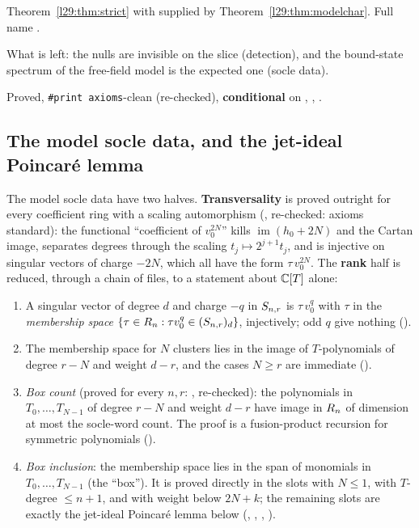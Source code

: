 \begin{dictionary}
Theorem~\ref{l29:thm:strict} with  supplied by Theorem~\ref{l29:thm:modelchar}. Full name
.
\end{dictionary}

\begin{physics}
What is left: the nulls are invisible on the slice (detection), and the bound-state spectrum of the free-field model
is the expected one (socle data).
\end{physics}

\begin{status}
Proved, \texttt{\#print axioms}-clean (re-checked), \textbf{conditional} on , , .
\end{status}

\subsection{The model socle data, and the jet-ideal Poincar\'e lemma}\label{l29:sec:poincare}

The model socle data have two halves. \textbf{Transversality} is proved outright for every coefficient ring with a
scaling automorphism (, re-checked: axioms standard): the functional ``coefficient of $v_0^{2N}$''
kills $\operatorname{im}(h_0+2N)$ and the Cartan image, separates degrees through the scaling $t_j\mapsto2^{j+1}t_j$, and
is injective on singular vectors of charge $-2N$, which all have the form $\tau\,v_0^{2N}$. The \textbf{rank} half is
reduced, through a chain of files, to a statement about ${\mathbb{C}}[T]$ alone:
\begin{enumerate}
\item A singular vector of degree $d$ and charge $-q$ in $S_{n,r}$ is $\tau\,v_0^{q}$ with $\tau$ in the
  \emph{membership space} $\{\tau\in R_n:\tau v_0^q\in(S_{n,r})_d\}$, injectively; odd $q$ give nothing
  ().
\item The membership space for $N$ clusters lies in the image of $T$-polynomials of degree $r-N$ and weight $d-r$, and the
  cases $N\ge r$ are immediate ().
\item \emph{Box count} (proved for every $n,r$: , re-checked): the polynomials in $T_0,\dots,T_{N-1}$
  of degree $r-N$ and weight $d-r$ have image in $R_n$ of dimension at most the socle-word count. The proof
  is a fusion-product recursion for symmetric polynomials ().
\item \emph{Box inclusion}: the membership space lies in the span of monomials in $T_0,\dots,T_{N-1}$ (the ``box''). It is
  proved directly in the slots with $N\le1$, with $T$-degree $\le n+1$, and with weight below $2N+k$; the remaining
  slots are exactly the jet-ideal Poincar\'e lemma below (, ,
  , ).
\end{enumerate}

